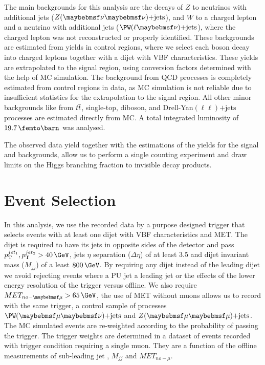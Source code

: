 The main backgrounds for this analysis are the decays of $Z$ to neutrinos with additional jets ($\Z (\nu \nu)\text{+jets}$), and $W$ to a charged lepton and a neutrino with additional jets ($\PW (\ell \nu)\text{+jets}$), where the charged lepton was not reconstructed or properly identified. These backgrounds are estimated from yields in control regions, where we select each boson decay into charged leptons together with a dijet with \gls{VBF} characteristics. These yields are extrapolated to the signal region, using conversion factors determined with the help of \gls{MC} simulation. The background from \gls{QCD} processes is completely estimated from control regions in data, as \gls{MC} simulation is not reliable due to insufficient statistics for the extrapolation to the signal region. All other minor backgrounds like from $t\overline{t}$, single-top, diboson, and Drell-Yan$(\ell\ell)\text{+jets}$ processes are estimated directly from \gls{MC}. A total integrated luminosity of $19.7\,\femto\barn$ was analysed. 

The observed data yield together with the estimations of the yields for the signal and backgrounds, allow us to perform a single counting experiment and draw limits on the Higgs branching fraction to invisible decay products.

\section{Event Selection}
\label{SECTION:PromptDataAnalysis_EventSelection}



In this analysis, we use the recorded data by a purpose designed trigger that selects events with at least one dijet with \gls{VBF} characteristics and \gls{MET}. The dijet is required to have its jets in opposite sides of the detector and pass $\pt^{jet_1},\pt^{jet_2} > 40\,\GeV$, jets $\eta$ separation ($\Delta\eta$) of at least 3.5 and dijet invariant mass ($M_{jj}$) of a least $800\,\GeV$. By requiring any dijet instead of the leading dijet we avoid rejecting events where a \gls{PU} jet a leading jet or the effects of the lower energy resolution of the trigger versus offline. We also require $MET_{no-\mu} > 65\,\GeV$, the use of \gls{MET} without muons allows us to record with the same trigger, a control sample of processes  $\PW(\mu\nu)\text{+jets}$ and $\Z(\mu\mu)\text{+jets}$. The \gls{MC} simulated events are re-weighted according to the probability of passing the trigger. The trigger weights are determined in a dataset of events recorded with trigger condition requiring a single muon. They are a function of the offline measurements of sub-leading jet \pt, $M_{jj}$ and $MET_{no-\mu}$.

